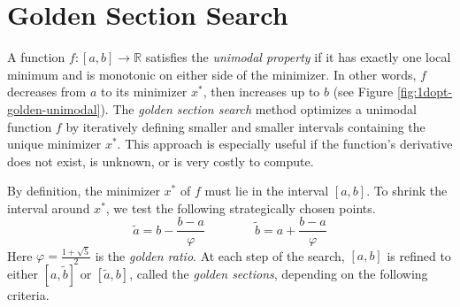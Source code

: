 
\section*{Golden Section Search} %

A function $f:[a,b]\rightarrow\mathbb{R}$ satisfies the \emph{unimodal property} if it has exactly one local minimum and is monotonic on either side of the minimizer.
In other words, $f$ decreases from $a$ to its minimizer $x^*$, then increases up to $b$ (see Figure \ref{fig:1dopt-golden-unimodal}).
The \emph{golden section search} method optimizes a unimodal function $f$ by iteratively defining smaller and smaller intervals containing the unique minimizer $x^*$.
This approach is especially useful if the function's derivative does not exist, is unknown, or is very costly to compute.

By definition, the minimizer $x^*$ of $f$ must lie in the interval $[a,b]$.
To shrink the interval around $x^*$, we test the following strategically chosen points.
\begin{equation*}
\tilde{a} = b - \frac{b - a}{\varphi}\qquad\qquad
\tilde{b} = a + \frac{b - a}{\varphi}
\end{equation*}
Here $\varphi = \frac{1 + \sqrt{5}}{2}$ is the \emph{golden ratio}.
At each step of the search, $[a,b]$ is refined to either $[a,\tilde{b}]$ or $[\tilde{a}, b]$, called the \emph{golden sections}, depending on the following criteria.


